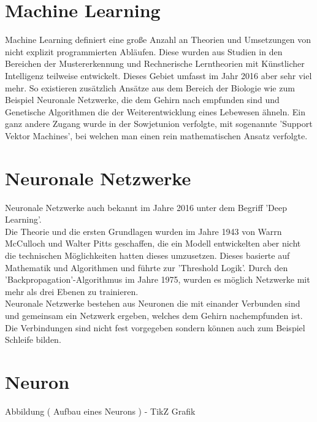 \section{Machine Learning}
\label{sec:Machine Learning}

Machine Learning definiert eine große Anzahl an Theorien und Umsetzungen von nicht explizit programmierten Abläufen. 
Diese wurden aus Studien in den Bereichen der Mustererkennung und Rechnerische Lerntheorien mit Künstlicher Intelligenz teilweise entwickelt. 
Dieses Gebiet umfasst im Jahr 2016 aber sehr viel mehr. 
So existieren zusätzlich Ansätze aus dem Bereich der Biologie wie zum Beispiel Neuronale Netzwerke, die dem Gehirn nach empfunden sind und Genetische Algorithmen die der Weiterentwicklung eines Lebewesen ähneln. 
Ein ganz andere Zugang wurde in der Sowjetunion verfolgte, mit sogenannte 'Support Vektor Machines', bei welchen man einen rein mathematischen Ansatz verfolgte.

\section{Neuronale Netzwerke}

Neuronale Netzwerke auch bekannt im Jahre 2016 unter dem Begriff 'Deep Learning'. \\

Die Theorie und die ersten Grundlagen wurden im Jahre 1943 von Warrn McCulloch und Walter Pitts geschaffen, die ein Modell entwickelten aber nicht die technischen Möglichkeiten hatten dieses umzusetzen.
Dieses basierte auf Mathematik und Algorithmen und führte zur 'Threshold Logik'. 
Durch den 'Backpropagation'-Algorithmus im Jahre 1975, wurden es möglich Netzwerke mit mehr als drei Ebenen zu trainieren. \\

Neuronale Netzwerke bestehen aus Neuronen die mit einander Verbunden sind und gemeinsam ein Netzwerk ergeben, welches dem Gehirn nachempfunden ist. 
Die Verbindungen sind nicht fest vorgegeben sondern können auch zum Beispiel Schleife bilden.


\section{Neuron}
\label{sec:Neuron}

Abbildung ( Aufbau eines Neurons ) - TikZ Grafik \\

